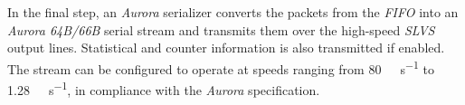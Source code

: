 In the final step, an \emph{Aurora} serializer converts the packets from the \emph{FIFO} into an \emph{Aurora 64B/66B} serial stream and transmits them over the high-speed \emph{SLVS} output lines. Statistical and counter information is also transmitted if enabled. The stream can be configured to operate at speeds ranging from \SI{80}{\mega\bit\per\second} to \SI{1.28}{\giga\bit\per\second}, in compliance with the \emph{Aurora} specification.



